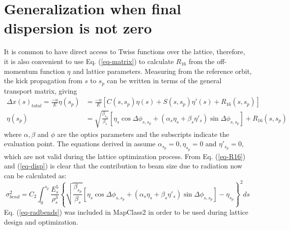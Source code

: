 \section{Generalization when final dispersion is not zero}
It is common to have direct access to Twiss functions over the lattice, therefore, it is also convenient to use Eq. (\ref{eq-matrix}) to calculate $R_{16}$ from the off-momentum function $\eta$ and lattice parameters. Measuring from the reference orbit, the kick propagation from $s$ to $s_p$ can be written in terms of the general transport matrix, giving
\begin{align}
\Delta x(s)_{total}=\frac{-u}{E}\eta(s_p) &= \frac{-u}{E} \left[C(s,s_p)\eta(s) + S(s,s_p)\eta'(s) + R_{16}(s,s_p)\right]\\
\eta(s_p) &= \sqrt{\frac{\beta_{s_p}}{\beta_s}}\left[\eta_s\cos\Delta\phi_{s,s_p}+(\alpha_s\eta_s+\beta_s\eta'_s)\sin\Delta\phi_{s,s_p}\right] + R_{16}(s,s_p)\label{eq-disp}
\end{align}
where $\alpha, \beta$ and $\phi$ are the optics parameters and the subscripts indicate the evaluation point. The equations derived in \cite{Sands} assume $\alpha_{s_p}=0, \eta_{s_p}=0$ and $\eta'_{s_p}=0$, which are not valid during the lattice optimization process. From Eq. (\ref{eq-R16}) and (\ref{eq-disp}) is clear that the contribution to beam size due to radiation now can be calculated as:
\begin{equation}
 \sigma_{bend}^2=C_2 \int_0^{s_p} \frac{E^5_s}{\rho^3_s}\left\{\sqrt{\frac{\beta_{s_p}}{\beta_s}}\left[\eta_s\cos\Delta\phi_{s,s_p}+(\alpha_s\eta_s+\beta_s\eta'_s)\sin\Delta\phi_{s,s_p}\right]-\eta_{s_p}\right\}^2ds\label{eq-radbends}
\end{equation}
Eq. (\ref{eq-radbends}) was included in MapClass2 in order to be used during lattice design and optimization.\par

